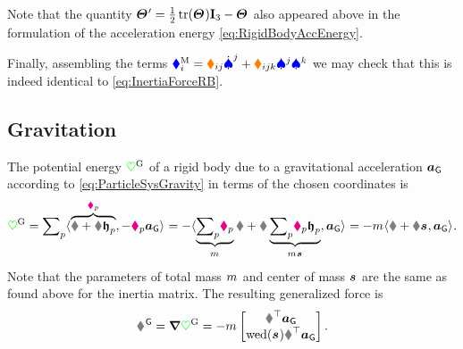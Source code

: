 Note that the quantity $\bodyMOIp{}{} = \tfrac{1}{2} \tr(\bodyMOI{}{})\idMat[3] - \bodyMOI{}{}$ also appeared above in the formulation of the acceleration energy \eqref{eq:RigidBodyAccEnergy}.

Finally, assembling the terms $\textcolor{blue}{\blacklozenge}^{\mathrm{M}}_{i} = \textcolor{orange}{\blacklozenge}_{ij} \dot{\textcolor{blue}{\spadesuit}}^{j} + \textcolor{orange}{\blacklozenge}_{ijk} \textcolor{blue}{\spadesuit}^{j}\textcolor{blue}{\spadesuit}^{k}$ we may check that this is indeed identical to \eqref{eq:InertiaForceRB}.


\subsection{Gravitation}
The potential energy $\textcolor{green}{\heartsuit}^{\mathrm{G}}$ of a rigid body due to a gravitational acceleration $\boldsymbol{a}_{\mathsf{G}}$ according to \eqref{eq:ParticleSysGravity} in terms of the chosen coordinates is
\begin{align}\label{eq:RBPotentialEnergyGravity}
 \potentialGravity 
 = \sumParticles \sProd{\overbrace{\r + \R \particleBodyPos{\PidxI}}^{\particlePos{\PidxI}}}{-\particleMass{\PidxI} \gravityAcc}
 = -\sProd{\underbrace{\sumParticles\! \particleMass{\PidxI}}_{\bodyMass{}{}} \r + \R \underbrace{\sumParticles\! \particleMass{\PidxI} \particleBodyPos{\PidxI}}_{\bodyMass{}{}\bodyCOM{}{}}}{\gravityAcc}
 = -\bodyMass{}{} \sProd{\r + \R \bodyCOM{}{}}{\gravityAcc}.
\end{align}
Note that the parameters of total mass $\bodyMass{}{}$ and center of mass $\bodyCOM{}{}$ are the same as found above for the inertia matrix.
The resulting generalized force is
\begin{align}
 \bodyGenForceGravity{}{} = \differential \potentialGravity = -\bodyMass{}{} \begin{bmatrix} \R^\top \gravityAcc \\ \wedOp(\bodyCOM{}{}) \R^\top \gravityAcc \end{bmatrix}.
\end{align}


